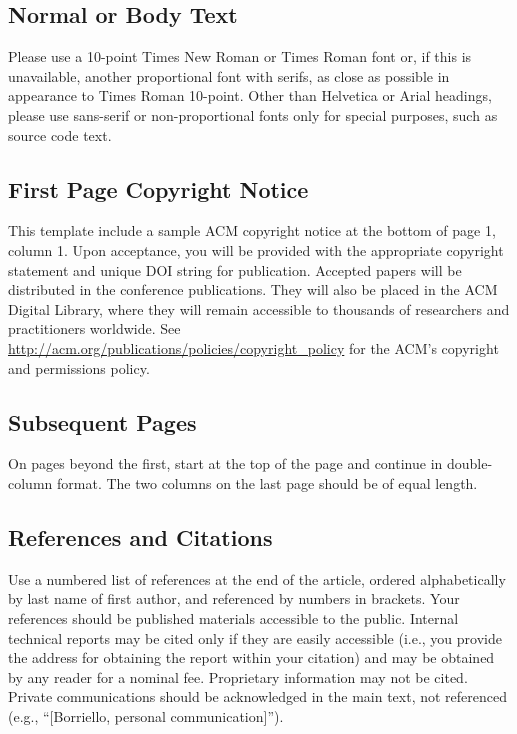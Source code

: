 \documentclass{sigchi}
\begin{document}
\subsection{Normal or Body Text}

Please use a 10-point Times New Roman or Times Roman font or, if this
is unavailable, another proportional font with serifs, as close as
possible in appearance to Times Roman 10-point. Other than Helvetica
or Arial headings, please use sans-serif or non-proportional fonts
only for special purposes, such as source code text.

\subsection{First Page Copyright Notice}
This template include a sample ACM copyright notice at the bottom of
page 1, column 1.  Upon acceptance, you will be provided with the
appropriate copyright statement and unique DOI string for publication.
Accepted papers will be distributed in the conference
publications. They will also be placed in the ACM Digital Library,
where they will remain accessible to thousands of researchers and
practitioners worldwide. See
\url{http://acm.org/publications/policies/copyright_policy} for the
ACM's copyright and permissions policy.

\subsection{Subsequent Pages}

On pages beyond the first, start at the top of the page and continue
in double-column format.  The two columns on the last page should be
of equal length.


\subsection{References and Citations}

Use a numbered list of references at the end of the article, ordered
alphabetically by last name of first author, and referenced by numbers
in
brackets.
Your references should be published materials accessible to the
public. Internal technical reports may be cited only if they are
easily accessible (i.e., you provide the address for obtaining the
report within your citation) and may be obtained by any reader for a
nominal fee. Proprietary information may not be cited. Private
communications should be acknowledged in the main text, not referenced
(e.g., ``[Borriello, personal communication]'').
\end{document}
